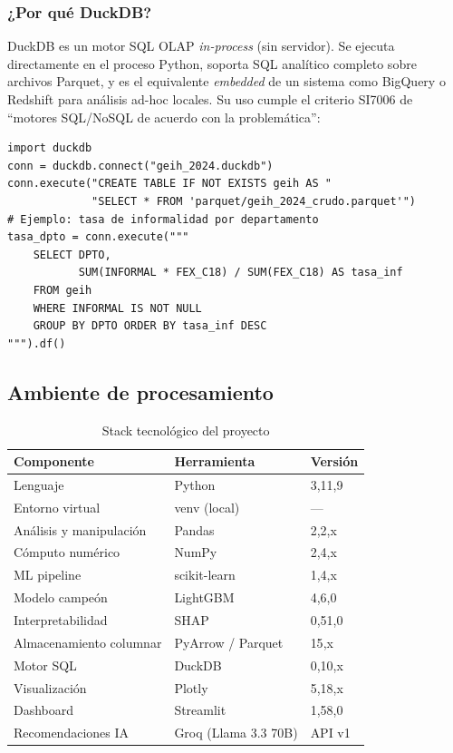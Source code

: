 \documentclass[12pt, a4paper]{article}
\begin{document}
\subsubsection{¿Por qué DuckDB?}

DuckDB es un motor SQL OLAP \textit{in-process} (sin servidor). Se ejecuta directamente
en el proceso Python, soporta SQL analítico completo sobre archivos Parquet, y es
el equivalente \textit{embedded} de un sistema como BigQuery o Redshift para análisis
ad-hoc locales. Su uso cumple el criterio SI7006 de ``motores SQL/NoSQL de acuerdo
con la problemática'':

\begin{lstlisting}[caption={Consulta analítica en DuckDB sobre el Parquet}]
import duckdb
conn = duckdb.connect("geih_2024.duckdb")
conn.execute("CREATE TABLE IF NOT EXISTS geih AS "
             "SELECT * FROM 'parquet/geih_2024_crudo.parquet'")
# Ejemplo: tasa de informalidad por departamento
tasa_dpto = conn.execute("""
    SELECT DPTO,
           SUM(INFORMAL * FEX_C18) / SUM(FEX_C18) AS tasa_inf
    FROM geih
    WHERE INFORMAL IS NOT NULL
    GROUP BY DPTO ORDER BY tasa_inf DESC
""").df()
\end{lstlisting}

\subsection{Ambiente de procesamiento}

\begin{table}[H]
\centering
\caption{Stack tecnológico del proyecto}
\label{tab:stack}
\begin{tabular}{lll}
\toprule
\textbf{Componente} & \textbf{Herramienta} & \textbf{Versión} \\
\midrule
Lenguaje & Python & 3{,}11{,}9 \\
Entorno virtual & venv (local) & — \\
Análisis y manipulación & Pandas & 2{,}2{,}x \\
Cómputo numérico & NumPy & 2{,}4{,}x \\
ML pipeline & scikit-learn & 1{,}4{,}x \\
Modelo campeón & LightGBM & 4{,}6{,}0 \\
Interpretabilidad & SHAP & 0{,}51{,}0 \\
Almacenamiento columnar & PyArrow / Parquet & 15{,}x \\
Motor SQL & DuckDB & 0{,}10{,}x \\
Visualización & Plotly & 5{,}18{,}x \\
Dashboard & Streamlit & 1{,}58{,}0 \\
Recomendaciones IA & Groq (Llama 3.3 70B) & API v1 \\
\bottomrule
\end{tabular}
\end{table}
\end{document}
